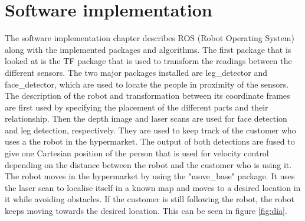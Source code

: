 \chapter{Software implementation}
The software implementation chapter describes ROS (Robot Operating System) along with the implemented packages and algorithms. The first package that is looked at is the TF package that is used to transform the readings between the different sensors. The two major packages installed are leg\_detector and face\_detector, which are used to locate the people in proximity of the sensors. \\

The description of the robot and transformation between its coordinate frames are first used by specifying the placement of the different parts and their relationship. Then the depth image and laser scans are used for face detection and leg detection, respectively. They are used to keep track of the customer who uses a the robot in the hypermarket. The output of both detections are fused to give one Cartesian position of the person that is used for velocity control depending on the distance between the robot and the customer who is using it. The robot moves in the hypermarket by using the "move\_base" package. It uses the laser scan to localise itself in a known map and moves to a desired location in it while avoiding obstacles. If the customer is still following the robot, the robot keeps moving towards the desired location. This can be seen in figure \ref{fig:dia}.

